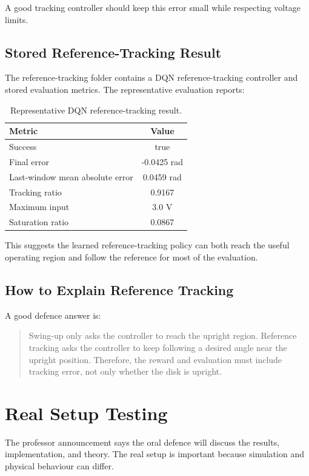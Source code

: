 \documentclass[11pt,a4paper]{article}
\begin{document}
A good tracking controller should keep this error small while respecting voltage limits.

\subsection{Stored Reference-Tracking Result}

The reference-tracking folder contains a DQN reference-tracking controller and stored evaluation metrics.
The representative evaluation reports:

\begin{table}[h]
\centering
\caption{Representative DQN reference-tracking result.}
\begin{tabular}{lc}
\toprule
Metric & Value \\
\midrule
Success & true \\
Final error & -0.0425 rad \\
Last-window mean absolute error & 0.0459 rad \\
Tracking ratio & 0.9167 \\
Maximum input & 3.0 V \\
Saturation ratio & 0.0867 \\
\bottomrule
\end{tabular}
\end{table}

This suggests the learned reference-tracking policy can both reach the useful operating region and follow the reference for most of the evaluation.

\subsection{How to Explain Reference Tracking}

A good defence answer is:

\begin{quote}
Swing-up only asks the controller to reach the upright region.
Reference tracking asks the controller to keep following a desired angle near the upright position.
Therefore, the reward and evaluation must include tracking error, not only whether the disk is upright.
\end{quote}

\section{Real Setup Testing}

The professor announcement says the oral defence will discuss the results, implementation, and theory.
The real setup is important because simulation and physical behaviour can differ.
\end{document}
